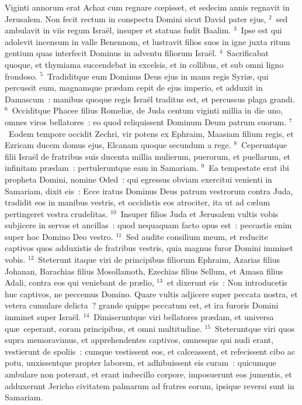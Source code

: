 \bchapter
\lettrine[lines=3,image=true,loversize=0.05,lraise=-0.03]{V}{}iginti annorum erat Achaz cum regnare cœpisset, et sedecim annis regnavit in Jerusalem. Non fecit rectum in conspectu Domini sicut David pater ejus,
${}^{2}$~sed ambulavit in viis regum Isra\"el, insuper et statuas fudit Baalim.
${}^{3}$~Ipse est qui adolevit incensum in valle Benennom, et lustravit filios suos in igne juxta ritum gentium quas interfecit Dominus in adventu filiorum Isra\"el.
${}^{4}$~Sacrificabat quoque, et thymiama succendebat in excelsis, et in collibus, et sub omni ligno frondoso.
${}^{5}$~Tradiditque eum Dominus Deus ejus in manu regis Syri\ae , qui percussit eum, magnamque pr\ae dam cepit de ejus imperio, et adduxit in Damascum~: manibus quoque regis Isra\"el traditus est, et percussus plaga grandi.
${}^{6}$~Occiditque Phacee filius Romeli\ae , de Juda centum viginti millia in die uno, omnes viros bellatores~: eo quod reliquissent Dominum Deum patrum suorum.
${}^{7}$~Eodem tempore occidit Zechri, vir potens ex Ephraim, Maasiam filium regis, et Ezricam ducem domus ejus, Elcanam quoque secundum a rege.
${}^{8}$~Ceperuntque filii Isra\"el de fratribus suis ducenta millia mulierum, puerorum, et puellarum, et infinitam pr\ae dam~: pertuleruntque eam in Samariam.
${}^{9}$~Ea tempestate erat ibi propheta Domini, nomine Oded~: qui egressus obviam exercitui venienti in Samariam, dixit eis~: Ecce iratus Dominus Deus patrum vestrorum contra Juda, tradidit eos in manibus vestris, et occidistis eos atrociter, ita ut ad c\ae lum pertingeret vestra crudelitas.
${}^{10}$~Insuper filios Juda et Jerusalem vultis vobis subjicere in servos et ancillas~: quod nequaquam facto opus est~: peccastis enim super hoc Domino Deo vestro.
${}^{11}$~Sed audite consilium meum, et reducite captivos quos adduxistis de fratribus vestris, quia magnus furor Domini imminet vobis.
${}^{12}$~Steterunt itaque viri de principibus filiorum Ephraim, Azarias filius Johanan, Barachias filius Mosollamoth, Ezechias filius Sellum, et Amasa filius Adali, contra eos qui veniebant de pr\ae lio,
${}^{13}$~et dixerunt eis~: Non introducetis huc captivos, ne peccemus Domino. Quare vultis adjicere super peccata nostra, et vetera cumulare delicta~? grande quippe peccatum est, et ira furoris Domini imminet super Isra\"el.
${}^{14}$~Dimiseruntque viri bellatores pr\ae dam, et universa qu\ae\ ceperant, coram principibus, et omni multitudine.
${}^{15}$~Steteruntque viri quos supra memoravimus, et apprehendentes captivos, omnesque qui nudi erant, vestierunt de spoliis~: cumque vestissent eos, et calceassent, et refecissent cibo ac potu, unxissentque propter laborem, et adhibuissent eis curam~: quicumque ambulare non poterant, et erant imbecillo corpore, imposuerunt eos jumentis, et adduxerunt Jericho civitatem palmarum ad fratres eorum, ipsique reversi sunt in Samariam.



